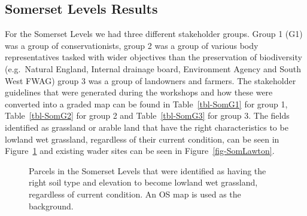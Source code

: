 \documentclass[
  12pt,
  letterpaper,
  DIV=11,
  numbers=noendperiod]{scrartcl}
\begin{document}
\newpage{}

\subsection{Somerset Levels Results}\label{somerset-levels-results}

For the Somerset Levels we had three different stakeholder groups. Group
1 (G1) was a group of conservationists, group 2 was a group of various
body representatives tasked with wider objectives than the preservation
of biodiversity (e.g.~Natural England, Internal drainage board,
Environment Agency and South West FWAG) group 3 was a group of
landowners and farmers. The stakeholder guidelines that were generated
during the workshops and how these were converted into a graded map can
be found in Table~\ref{tbl-SomG1} for group 1, Table~\ref{tbl-SomG2} for
group 2 and Table~\ref{tbl-SomG3} for group 3. The fields identified as
grassland or arable land that have the right characteristics to be
lowland wet grassland, regardless of their current condition, can be
seen in Figure~\ref{fig-SomSuitHab} and existing wader sites can be seen
in Figure~\ref{fig-SomLawton}.

\begin{figure}[H]


\caption{\label{fig-SomSuitHab}Parcels in the Somerset Levels that were
identified as having the right soil type and elevation to become lowland
wet grassland, regardless of current condition. An OS map is used as the
background.}

\end{figure}%
\end{document}

